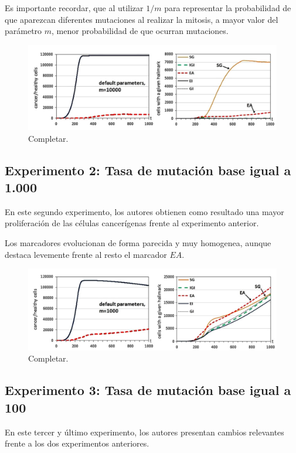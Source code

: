 Es importante recordar, que al utilizar $1/m$ para representar la probabilidad
de que aparezcan diferentes mutaciones al realizar la mitosis, a mayor valor
del parámetro $m$, menor probabilidad de que ocurran mutaciones.

\begin{figure}[h]
\centering
\includegraphics[scale=0.6]{figures/experiments/exp1}
\caption{Completar.}
\end{figure}

\subsection{Experimento 2: Tasa de mutación base igual a 1.000}

En este segundo experimento, los autores obtienen como resultado una mayor proliferación
de las células cancerígenas frente al experimento anterior.

Los marcadores evolucionan de forma parecida y muy homogenea, aunque destaca levemente
frente al resto el marcador $EA$.

\begin{figure}[h]
\centering
\includegraphics[scale=0.6]{figures/experiments/exp2}
\caption{Completar.}
\end{figure}

\subsection{Experimento 3: Tasa de mutación base igual a 100}

En este tercer y último experimento, los autores presentan cambios relevantes frente a los dos
experimentos anteriores.


